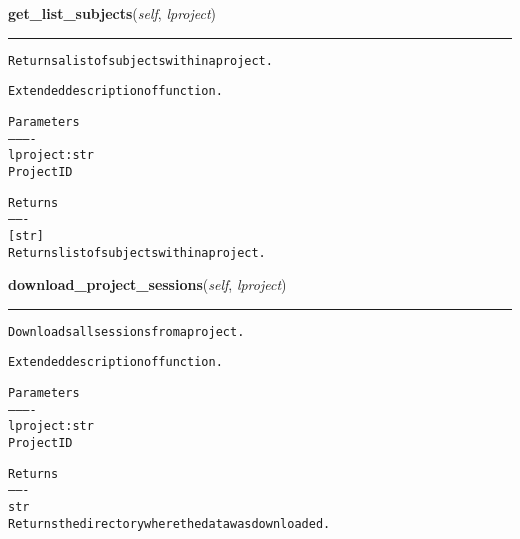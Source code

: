     \label{source:Xnat:Xnat:get_list_subjects}

    \vspace{0.5ex}

\hspace{.8\funcindent}\begin{boxedminipage}{\funcwidth}

    \raggedright \textbf{get\_list\_subjects}(\textit{self}, \textit{lproject})

    \vspace{-1.5ex}

    \rule{\textwidth}{0.5\fboxrule}
\setlength{\parskip}{2ex}
\begin{alltt}

Returns a list of subjects within a project.

Extended description of function.

Parameters
----------
lproject : str
    Project ID

Returns
-------
[str]
    Returns list of subjects within a project.
\end{alltt}

\setlength{\parskip}{1ex}
    \end{boxedminipage}

    \label{source:Xnat:Xnat:download_project_sessions}

    \vspace{0.5ex}

\hspace{.8\funcindent}\begin{boxedminipage}{\funcwidth}

    \raggedright \textbf{download\_project\_sessions}(\textit{self}, \textit{lproject})

    \vspace{-1.5ex}

    \rule{\textwidth}{0.5\fboxrule}
\setlength{\parskip}{2ex}
\begin{alltt}

Downloads all sessions from a project.

Extended description of function.

Parameters
----------
lproject : str
    Project ID

Returns
-------
str
    Returns the directory where the data was downloaded.
\end{alltt}

\setlength{\parskip}{1ex}
    \end{boxedminipage}

